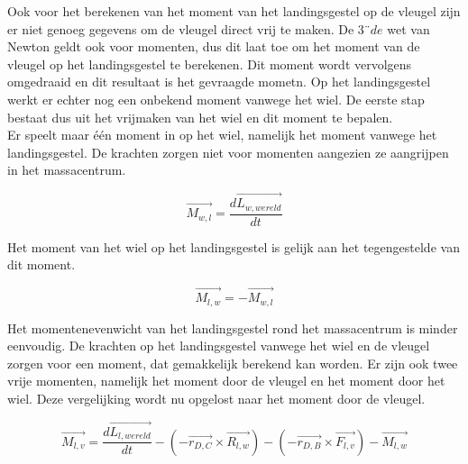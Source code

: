 Ook voor het berekenen van het moment van het landingsgestel op de vleugel zijn er niet genoeg gegevens om de vleugel direct vrij te maken. De $3¨{de}$ wet van Newton geldt ook voor momenten, dus dit laat toe om het moment van de vleugel op het landingsgestel te berekenen. Dit moment wordt vervolgens omgedraaid en dit resultaat is het gevraagde mometn. Op het landingsgestel werkt er echter nog een onbekend moment vanwege het wiel. De eerste stap bestaat dus uit het vrijmaken van het wiel en dit moment te bepalen.\\

Er speelt maar \'e\'en moment in op het wiel, namelijk het moment vanwege het landingsgestel. De krachten zorgen niet voor momenten aangezien ze aangrijpen in het massacentrum.

\begin{equation*}
\overrightarrow{M_{w,l}}=\frac{d\overrightarrow{L_{w,wereld}}}{dt}
\end{equation*}

Het moment van het wiel op het landingsgestel is gelijk aan het tegengestelde van dit moment.

\begin{equation*}
\overrightarrow{M_{l,w}}=-\overrightarrow{M_{w,l}}
\end{equation*}

Het momentenevenwicht van het landingsgestel rond het massacentrum is minder eenvoudig. De krachten op het landingsgestel vanwege het wiel en de vleugel zorgen voor een moment, dat gemakkelijk berekend kan worden. Er zijn ook twee vrije momenten, namelijk het moment door de vleugel en het moment door het wiel. Deze vergelijking wordt nu opgelost naar het moment door de vleugel.

\begin{equation*}
\overrightarrow{M_{l,v}}=\frac{d\overrightarrow{L_{l,wereld}}}{dt}-\left(-\overrightarrow{{r}_{D,C}}\times \overrightarrow{R_{l,w}}\right)-\left(-\overrightarrow{{r}_{D,B}}\times \overrightarrow{F_{l,v}} \right)-\overrightarrow{M_{l,w}}
\end{equation*}

